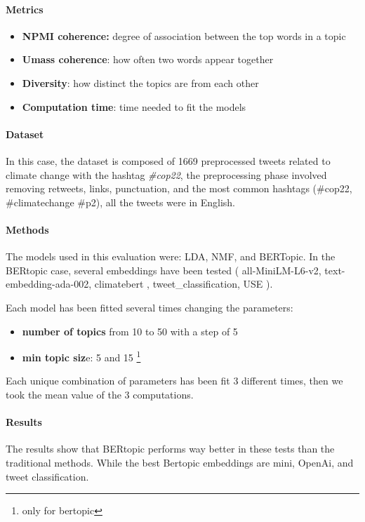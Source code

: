 \paragraph{Metrics}

\begin{itemize}
    \item \textbf{NPMI coherence:} degree of association between the top words in a topic
    \item \textbf{Umass coherence}: how often two words appear together
    \item \textbf{Diversity}: how distinct the topics are from each other
    \item \textbf{Computation time}: time needed to fit the models
\end{itemize}


\paragraph{Dataset}
In this case, the dataset is composed of 1669 preprocessed tweets related to climate change with the hashtag \textit{\#cop22}, the preprocessing phase involved removing retweets, links, punctuation, and the most common hashtags (\#cop22, \#climatechange \#p2), all the tweets were in English.

\paragraph{Methods}

The models used in this evaluation were: LDA, NMF, and BERTopic. In the BERtopic case, several embeddings have been tested (  all-MiniLM-L6-v2, text-embedding-ada-002, climatebert \cite{webersinke_climatebert_2022}, tweet\_classification, USE \cite{cer_use_2018}).

Each model has been fitted several times changing the parameters:
\begin{itemize}
    \item  \textbf{number of topics} from 10 to 50 with a step of 5 
    \item \textbf{min topic siz}e: 5 and 15 \footnote{only for bertopic}
\end{itemize}


Each unique combination of parameters has been fit 3 different times, then we took the mean value of the 3 computations.

\paragraph{Results}
The results show that BERtopic performs way better in these tests than the traditional methods. While the best Bertopic embeddings are mini, OpenAi, and tweet classification.

